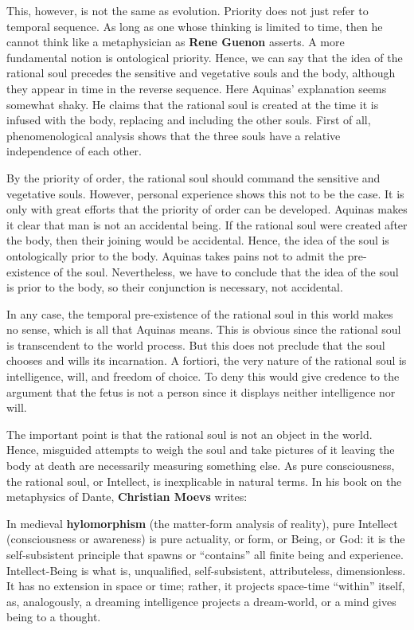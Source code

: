 This, however, is not the same as evolution. Priority does not just refer to temporal sequence. As long as one whose thinking is limited to time, then he cannot think like a metaphysician as \textbf{Rene Guenon} asserts. A more fundamental notion is ontological priority. Hence, we can say that the idea of the rational soul precedes the sensitive and vegetative souls and the body, although they appear in time in the reverse sequence. Here Aquinas' explanation seems somewhat shaky. He claims that the rational soul is created at the time it is infused with the body, replacing and including the other souls. First of all, phenomenological analysis shows that the three souls have a relative independence of each other.

By the priority of order, the rational soul should command the sensitive and vegetative souls. However, personal experience shows this not to be the case. It is only with great efforts that the priority of order can be developed. Aquinas makes it clear that man is not an accidental being. If the rational soul were created after the body, then their joining would be accidental. Hence, the idea of the soul is ontologically prior to the body. Aquinas takes pains not to admit the pre-existence of the soul. Nevertheless, we have to conclude that the idea of the soul is prior to the body, so their conjunction is necessary, not accidental.

In any case, the temporal pre-existence of the rational soul in this world makes no sense, which is all that Aquinas means. This is obvious since the rational soul is transcendent to the world process. But this does not preclude that the soul chooses and wills its incarnation. A fortiori, the very nature of the rational soul is intelligence, will, and freedom of choice. To deny this would give credence to the argument that the fetus is not a person since it displays neither intelligence nor will.

The important point is that the rational soul is not an object in the world. Hence, misguided attempts to weigh the soul and take pictures of it leaving the body at death are necessarily measuring something else. As pure consciousness, the rational soul, or Intellect, is inexplicable in natural terms. In his book on the metaphysics of Dante, \textbf{Christian Moevs} writes:

\begin{quotex}
In medieval \textbf{hylomorphism} (the matter-form analysis of reality), pure Intellect (consciousness or awareness) is pure actuality, or form, or Being, or God: it is the self-subsistent principle that spawns or ``contains'' all finite being and experience. Intellect-Being is what is, unqualified, self-subsistent, attributeless, dimensionless. It has no extension in space or time; rather, it projects space-time ``within'' itself, as, analogously, a dreaming intelligence projects a dream-world, or a mind gives being to a thought.
\end{quotex}




